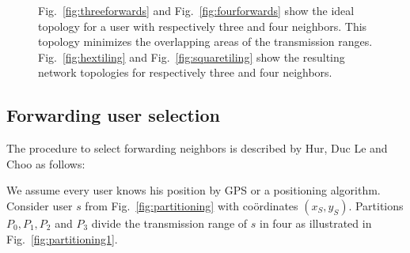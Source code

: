 \begin{figure}
\caption{\label{fig:forwarding} \cite{dtc2} Fig.~\ref{fig:threeforwards} and Fig.~\ref{fig:fourforwards} show the ideal topology for a user with respectively three and four neighbors. This topology minimizes the overlapping areas of the transmission ranges. Fig.~\ref{fig:hextiling} and Fig.~\ref{fig:squaretiling} show the resulting network topologies for respectively three and four neighbors.}
\end{figure}

\subsection{Forwarding user selection}\label{subsec:forwardingSel}

The procedure to select forwarding neighbors is described by Hur, Duc Le and Choo as follows:

We assume every user knows his position by GPS or a positioning algorithm. Consider user $s$ from Fig.~\ref{fig:partitioning} with co\"ordinates $(x_S,y_S)$. Partitions $P_0,P_1,P_2$ and $P_3$ divide the transmission range of $s$ in four as illustrated in Fig.~\ref{fig:partitioning1}. 

